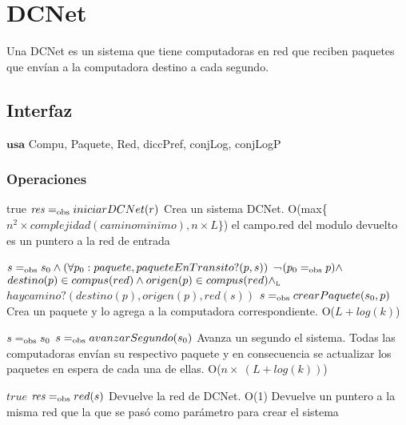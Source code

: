 
\section{DCNet}

Una DCNet es un sistema que tiene computadoras en red que reciben paquetes que envían a la computadora destino a cada segundo.

\subsection{Interfaz}

$\textbf{usa}$  
Compu, Paquete, Red, diccPref, conjLog, conjLogP


\subsubsection*{Operaciones}


 {true}
 {$\text{\textit{res}} =_{\mathrm{obs}} iniciarDCNet(r)$}
 {Crea un sistema DCNet.}
 {O(max\{$n^2 \times complejidad(caminominimo),n \times L\}$)}
 {el campo.red del modulo devuelto es un puntero a la red de entrada}

 {$s =_{\mathrm{obs}} s_0 \land (\forall p_0:paquete,paqueteEnTransito?(p,s))$ ¬$(p_0 =_{\mathrm{obs}} p) \land$ \\ $destino(p) \in compus(red) \land origen(p) \in compus(red) \land_{\mathrm{\scriptscriptstyle{L}}} $ \\ $haycamino?(destino(p),origen(p),red(s))$}
 {$s =_{\mathrm{obs}} crearPaquete(s_0, p)$}
 {Crea un paquete y lo agrega a la computadora correspondiente.}
 {O($L + log(k)$)}
 {}
 
 {$s =_{\mathrm{obs}} s_0$}
 {$s =_{\mathrm{obs}} avanzarSegundo(s_0)$}
 {Avanza un segundo el sistema. Todas las computadoras envían su respectivo paquete y en consecuencia se actualizar los paquetes en espera de cada una de ellas.}
 {O($n \times\ (L + log(k))$)}
 
 {$true$}
 {$\text{\textit{res}} =_{\mathrm{obs}} red(s)$}
 {Devuelve la red de DCNet.}
 {O(1)}
 {Devuelve un puntero a la misma red que la que se pas\'o como par\'ametro para crear el sistema}

